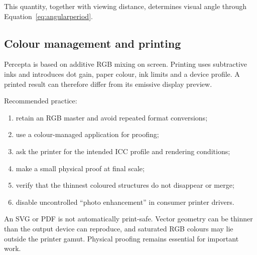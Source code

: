 This quantity, together with viewing distance, determines visual angle through Equation~\eqref{eq:angularperiod}.

\subsection{Colour management and printing}

Percepta is based on additive RGB mixing on screen. Printing uses subtractive inks and introduces dot gain, paper colour, ink limits and a device profile. A printed result can therefore differ from its emissive display preview.

Recommended practice:

\begin{enumerate}
  \item retain an RGB master and avoid repeated format conversions;
  \item use a colour-managed application for proofing;
  \item ask the printer for the intended ICC profile and rendering conditions;
  \item make a small physical proof at final scale;
  \item verify that the thinnest coloured structures do not disappear or merge;
  \item disable uncontrolled ``photo enhancement'' in consumer printer drivers.
\end{enumerate}

\begin{warningbox}
An SVG or PDF is not automatically print-safe. Vector geometry can be thinner than the output device can reproduce, and saturated RGB colours may lie outside the printer gamut. Physical proofing remains essential for important work.
\end{warningbox}


